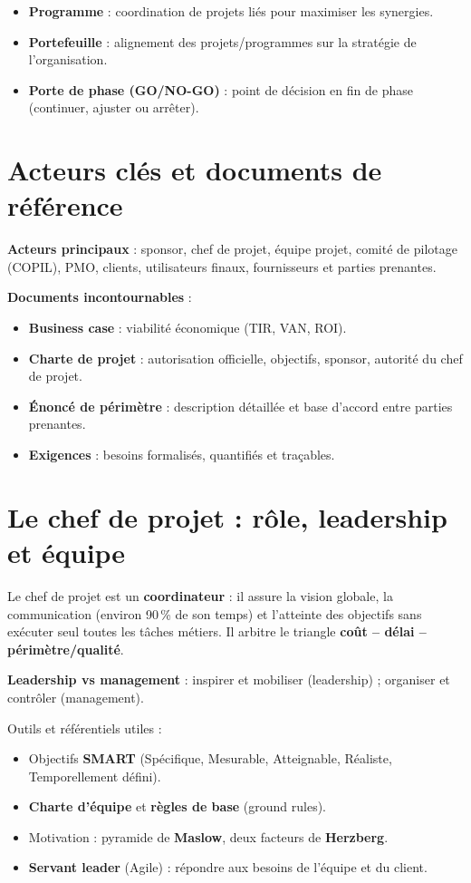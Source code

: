 \documentclass[11pt,a4paper]{article}
\begin{document}
\begin{itemize}
    \item \textbf{Programme} : coordination de projets liés pour maximiser les synergies.
    \item \textbf{Portefeuille} : alignement des projets/programmes sur la stratégie de l'organisation.
    \item \textbf{Porte de phase (GO/NO-GO)} : point de décision en fin de phase (continuer, ajuster ou arrêter).
\end{itemize}

\section{Acteurs clés et documents de référence}

\textbf{Acteurs principaux} : sponsor, chef de projet, équipe projet, comité de pilotage (COPIL), PMO, clients, utilisateurs finaux, fournisseurs et parties prenantes.

\textbf{Documents incontournables} :
\begin{itemize}
    \item \textbf{Business case} : viabilité économique (TIR, VAN, ROI).
    \item \textbf{Charte de projet} : autorisation officielle, objectifs, sponsor, autorité du chef de projet.
    \item \textbf{Énoncé de périmètre} : description détaillée et base d'accord entre parties prenantes.
    \item \textbf{Exigences} : besoins formalisés, quantifiés et traçables.
\end{itemize}

\section{Le chef de projet : rôle, leadership et équipe}

Le chef de projet est un \textbf{coordinateur} : il assure la vision globale, la communication (environ 90\,\% de son temps) et l'atteinte des objectifs sans exécuter seul toutes les tâches métiers. Il arbitre le triangle \textbf{coût -- délai -- périmètre/qualité}.

\textbf{Leadership vs management} : inspirer et mobiliser (leadership) ; organiser et contrôler (management).

Outils et référentiels utiles :
\begin{itemize}
    \item Objectifs \textbf{SMART} (Spécifique, Mesurable, Atteignable, Réaliste, Temporellement défini).
    \item \textbf{Charte d'équipe} et \textbf{règles de base} (ground rules).
    \item Motivation : pyramide de \textbf{Maslow}, deux facteurs de \textbf{Herzberg}.
    \item \textbf{Servant leader} (Agile) : répondre aux besoins de l'équipe et du client.
\end{itemize}
\end{document}
